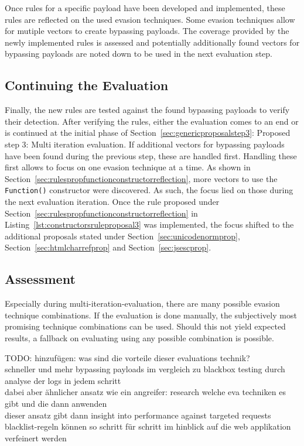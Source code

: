 Once rules for a specific payload have been developed and implemented, these rules are reflected on the used evasion techniques. Some evasion techniques allow for mutiple vectors to create bypassing payloads. The coverage provided by the newly implemented rules is assessed and potentially additionally found vectors for bypassing payloads are noted down to be used in the next evaluation step. 
\subsection{Continuing the Evaluation}
Finally, the new rules are tested against the found bypassing payloads to verify their detection. After verifying the rules, either the evaluation comes to an end or is continued at the initial phase of Section~\ref{sec:genericproposalstep3}: Proposed step 3: Multi iteration evaluation. If additional vectors for bypassing payloads have been found during the previous step, these are handled first. Handling these first allows to focus on one evasion technique at a time. As shown in Section~\ref{sec:rulespropfunctionconstructorreflection}, more vectors to use the \verb|Function()| constructor were discovered. As such, the focus lied on those during the next evaluation iteration. Once the rule proposed under Section~\ref{sec:rulespropfunctionconstructorreflection} in Listing~\ref{lst:constructorsruleproposal3} was implemented, the focus shifted to the additional proposals stated under Section~\ref{sec:unicodenormprop}, Section~\ref{sec:htmlcharrefprop} and Section~\ref{sec:jsescprop}.

\subsection{Assessment}

Especially during multi-iteration-evaluation, there are many possible evasion technique combinations. If the evaluation is done manually, the subjectively most promising technique combinations can be used. Should this not yield expected results, a fallback on evaluating using any possible combination is possible.

{\color{red} TODO: hinzufügen: was sind die vorteile dieser evaluations technik?  \\
schneller und mehr bypassing payloads im vergleich zu blackbox testing durch analyse der logs in jedem schritt \\
dabei aber ähnlicher ansatz wie ein angreifer: research welche eva techniken es gibt und die dann anwenden \\
dieser ansatz gibt dann insight into performance against targeted requests \\
blacklist-regeln können so schritt für schritt im hinblick auf die web applikation verfeinert werden \\
}


